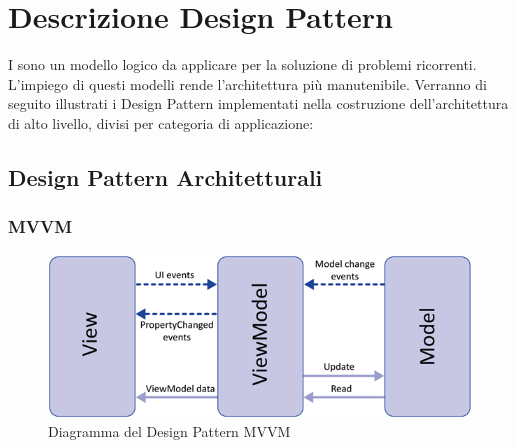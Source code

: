 \section{Descrizione Design Pattern }
I  sono un modello logico da applicare per la soluzione di problemi
ricorrenti. L’impiego di questi modelli rende l'architettura più manutenibile. Verranno
di seguito illustrati i Design Pattern implementati nella costruzione dell’architettura di
alto livello, divisi per categoria di applicazione:
	\subsection{Design Pattern Architetturali}
	
		\subsubsection{MVVM}
		\begin{figure}[H]
		\centering
		\includegraphics[width=0.5\linewidth]{GraficiAppendici/mvvm.png}
		\caption{Diagramma del Design Pattern MVVM}
	\end{figure}
